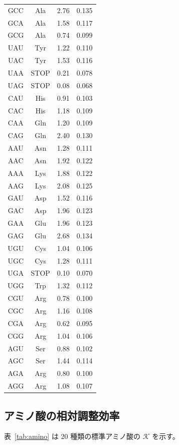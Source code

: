 \documentclass[12pt,a4paper]{ltjsarticle}
\newcommand{\REL}{\mathcal{K}}          %
\begin{document}
\begin{longtable}{|c|c|c|c|}
		GCC & Ala & 2.76 & 0.135 \\
		GCA & Ala & 1.58 & 0.117 \\
		GCG & Ala & 0.74 & 0.099 \\
		UAU & Tyr & 1.22 & 0.110 \\
		UAC & Tyr & 1.53 & 0.116 \\
		UAA & STOP & 0.21 & 0.078 \\
		UAG & STOP & 0.08 & 0.068 \\
		CAU & His & 0.91 & 0.103 \\
		CAC & His & 1.18 & 0.109 \\
		CAA & Gln & 1.20 & 0.109 \\
		CAG & Gln & 2.40 & 0.130 \\
		AAU & Asn & 1.28 & 0.111 \\
		AAC & Asn & 1.92 & 0.122 \\
		AAA & Lys & 1.88 & 0.122 \\
		AAG & Lys & 2.08 & 0.125 \\
		GAU & Asp & 1.52 & 0.116 \\
		GAC & Asp & 1.96 & 0.123 \\
		GAA & Glu & 1.96 & 0.123 \\
		GAG & Glu & 2.68 & 0.134 \\
		UGU & Cys & 1.04 & 0.106 \\
		UGC & Cys & 1.28 & 0.111 \\
		UGA & STOP & 0.10 & 0.070 \\
		UGG & Trp & 1.32 & 0.112 \\
		CGU & Arg & 0.78 & 0.100 \\
		CGC & Arg & 1.16 & 0.108 \\
		CGA & Arg & 0.62 & 0.095 \\
		CGG & Arg & 1.04 & 0.106 \\
		AGU & Ser & 0.88 & 0.102 \\
		AGC & Ser & 1.44 & 0.114 \\
		AGA & Arg & 0.80 & 0.100 \\
		AGG & Arg & 1.08 & 0.107 \\
		\hline
	\end{longtable}
	
	\subsection{アミノ酸の相対調整効率}
	\label{sec:aminoacids}
	表~\ref{tab:amino} は 20 種類の標準アミノ酸の \(\REL\) を示す。
	
\end{document}
